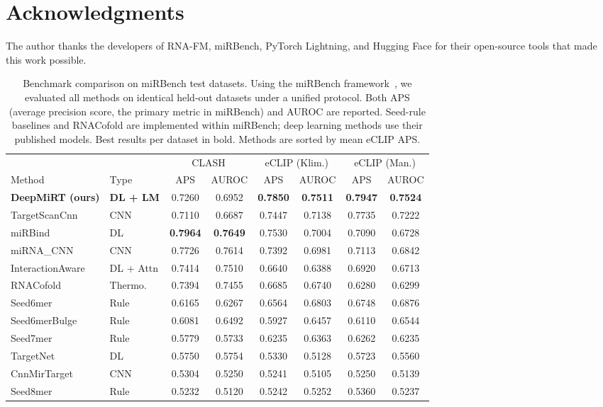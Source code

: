 \documentclass[10pt,a4paper]{article}
\begin{document}
\section*{Acknowledgments}

The author thanks the developers of RNA-FM, miRBench, PyTorch Lightning, and Hugging Face for their open-source tools that made this work possible.


\begin{table}[!htbp]
\centering
\caption{Benchmark comparison on miRBench test datasets. Using the miRBench framework~\citep{sammut2025mirbench}, we evaluated all methods on identical held-out datasets under a unified protocol. Both APS (average precision score, the primary metric in miRBench) and AUROC are reported. Seed-rule baselines and RNACofold are implemented within miRBench; deep learning methods use their published models. Best results per dataset in bold. Methods are sorted by mean eCLIP APS.}
\label{tab:benchmark}
\small
\begin{tabular}{ll cc cc cc}
\toprule
 & & \multicolumn{2}{c}{CLASH} & \multicolumn{2}{c}{eCLIP (Klim.)} & \multicolumn{2}{c}{eCLIP (Man.)} \\
\cmidrule(lr){3-4} \cmidrule(lr){5-6} \cmidrule(lr){7-8}
Method & Type & APS & AUROC & APS & AUROC & APS & AUROC \\
\midrule
\textbf{DeepMiRT (ours)} & \textbf{DL + LM} & 0.7260 & 0.6952 & \textbf{0.7850} & \textbf{0.7511} & \textbf{0.7947} & \textbf{0.7524} \\
TargetScanCnn & CNN & 0.7110 & 0.6687 & 0.7447 & 0.7138 & 0.7735 & 0.7222 \\
miRBind & DL & \textbf{0.7964} & \textbf{0.7649} & 0.7530 & 0.7004 & 0.7090 & 0.6728 \\
miRNA\_CNN & CNN & 0.7726 & 0.7614 & 0.7392 & 0.6981 & 0.7113 & 0.6842 \\
InteractionAware & DL + Attn & 0.7414 & 0.7510 & 0.6640 & 0.6388 & 0.6920 & 0.6713 \\
RNACofold & Thermo. & 0.7394 & 0.7455 & 0.6685 & 0.6740 & 0.6280 & 0.6299 \\
Seed6mer & Rule & 0.6165 & 0.6267 & 0.6564 & 0.6803 & 0.6748 & 0.6876 \\
Seed6merBulge & Rule & 0.6081 & 0.6492 & 0.5927 & 0.6457 & 0.6110 & 0.6544 \\
Seed7mer & Rule & 0.5779 & 0.5733 & 0.6235 & 0.6363 & 0.6262 & 0.6235 \\
TargetNet & DL & 0.5750 & 0.5754 & 0.5330 & 0.5128 & 0.5723 & 0.5560 \\
CnnMirTarget & CNN & 0.5304 & 0.5250 & 0.5241 & 0.5105 & 0.5250 & 0.5139 \\
Seed8mer & Rule & 0.5232 & 0.5120 & 0.5242 & 0.5252 & 0.5360 & 0.5237 \\
\bottomrule
\end{tabular}
\end{table}
\end{document}
